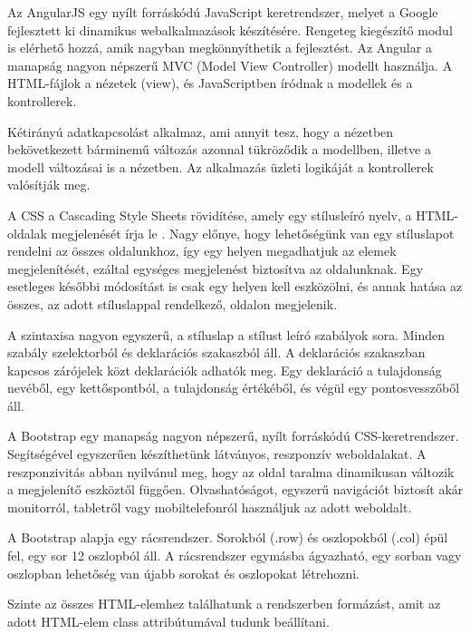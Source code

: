 
Az AngularJS egy nyílt forráskódú JavaScript keretrendszer, melyet a Google fejlesztett ki dinamikus webalkalmazások készítésére. Rengeteg kiegészítő modul is elérhető hozzá, amik nagyban megkönnyíthetik a fejlesztést. Az Angular a manapság nagyon népszerű MVC (Model View Controller) modellt használja. A HTML-fájlok a nézetek (view), és JavaScriptben íródnak a modellek és a kontrollerek.

Kétirányú adatkapcsolást alkalmaz, ami annyit tesz, hogy a nézetben bekövetkezett bárminemű változás azonnal tükröződik a modellben, illetve a modell változásai is a nézetben. Az alkalmazás üzleti logikáját a kontrollerek valósítják meg.


A CSS a Cascading Style Sheets rövidítése, amely egy stílusleíró nyelv, a HTML-oldalak megjelenését írja le \cite{css}. Nagy előnye, hogy lehetőségünk van egy stíluslapot rendelni az összes oldalunkhoz, így egy helyen megadhatjuk az elemek megjelenítését, ezáltal egységes megjelenést biztosítva az oldalunknak. Egy esetleges későbbi módosítást is csak egy helyen kell eszközölni, és annak hatása az összes, az adott stíluslappal rendelkező, oldalon megjelenik.

A szintaxisa nagyon egyszerű, a stíluslap a stílust leíró szabályok sora. Minden szabály szelektorból és deklarációs szakaszból áll. A deklarációs szakaszban kapcsos zárójelek közt deklarációk adhatók meg. Egy deklaráció a tulajdonság nevéből, egy kettőspontból, a tulajdonság értékéből, és végül egy pontosvesszőből áll.


A Bootstrap egy manapság nagyon népszerű, nyílt forráskódú CSS-keretrendszer. Segítségével egyszerűen készíthetünk látványos, reszponzív weboldalakat. A reszponzivitás abban nyilvánul meg, hogy az oldal taralma dinamikusan változik a megjelenítő eszköztől függően. Olvashatóságot, egyszerű navigációt biztosít akár monitorról, tabletről vagy mobiltelefonról használjuk az adott weboldalt.

A Bootstrap alapja egy rácsrendszer. Sorokból (.row) és oszlopokból (.col) épül fel, egy sor 12 oszlopból áll. A rácsrendszer egymásba ágyazható, egy sorban vagy oszlopban lehetőség van újabb sorokat és oszlopokat létrehozni.

Szinte az összes HTML-elemhez találhatunk a rendszerben formázást, amit az adott HTML-elem class attribútumával tudunk beállítani.

